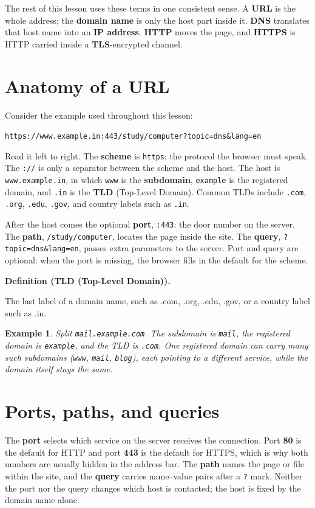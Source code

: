\documentclass[11pt]{article}
\newtheorem{example}{Example}[section]
\newenvironment{definitionbox}[1]{%
  \par\noindent\textbf{Definition (#1).}\ \itshape
}{\par\vspace{0.3em}}
\begin{document}
The rest of this lesson uses these terms in one consistent sense. A
\textbf{URL} is the whole address; the \textbf{domain name} is only the host
part inside it. \textbf{DNS} translates that host name into an \textbf{IP
address}. \textbf{HTTP} moves the page, and \textbf{HTTPS} is HTTP carried
inside a \textbf{TLS}-encrypted channel.

\section{Anatomy of a URL}
Consider the example used throughout this lesson:
\begin{center}
\texttt{https://www.example.in:443/study/computer?topic=dns\&lang=en}
\end{center}
Read it left to right. The \textbf{scheme} is \texttt{https}: the protocol
the browser must speak. The \texttt{://} is only a separator between the
scheme and the host. The host is \texttt{www.example.in}, in which
\texttt{www} is the \textbf{subdomain}, \texttt{example} is the registered
domain, and \texttt{.in} is the \textbf{TLD} (Top-Level Domain). Common TLDs
include \texttt{.com}, \texttt{.org}, \texttt{.edu}, \texttt{.gov}, and
country labels such as \texttt{.in}.

After the host comes the optional \textbf{port}, \texttt{:443}: the door
number on the server. The \textbf{path}, \texttt{/study/computer}, locates
the page inside the site. The \textbf{query}, \texttt{?topic=dns\&lang=en},
passes extra parameters to the server. Port and query are optional: when the
port is missing, the browser fills in the default for the scheme.

\begin{definitionbox}{TLD (Top-Level Domain)}
The last label of a domain name, such as .com, .org, .edu, .gov, or a
country label such as .in.
\end{definitionbox}

\begin{example}
Split \texttt{mail.example.com}. The subdomain is \texttt{mail}, the
registered domain is \texttt{example}, and the TLD is \texttt{.com}. One
registered domain can carry many such subdomains (\texttt{www},
\texttt{mail}, \texttt{blog}), each pointing to a different service, while
the domain itself stays the same.
\end{example}

\section{Ports, paths, and queries}
The \textbf{port} selects which service on the server receives the
connection. Port \textbf{80} is the default for HTTP and port \textbf{443}
is the default for HTTPS, which is why both numbers are usually hidden in
the address bar. The \textbf{path} names the page or file within the site,
and the \textbf{query} carries name--value pairs after a \texttt{?} mark.
Neither the port nor the query changes which host is contacted; the host is
fixed by the domain name alone.
\end{document}
